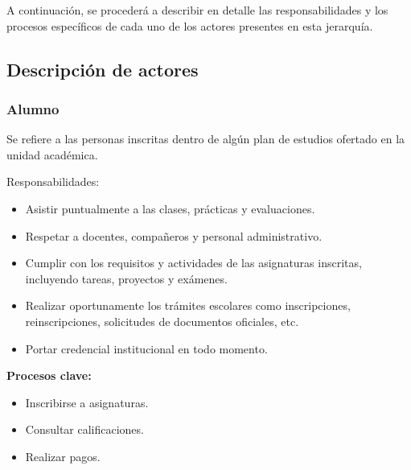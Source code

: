 A continuación, se procederá a describir en detalle las responsabilidades y los procesos específicos de cada uno de los actores presentes en esta jerarquía.






\newpage

\subsection{Descripción de actores}

\begin{Usuario}{\hypertarget{tAlumno}{\subsubsection{Alumno}}}{
    Se refiere a las personas inscritas dentro de algún plan de estudios ofertado en la unidad académica.
}

\item[Responsabilidades:] \cdtEmpty
\begin{itemize}
    \item Asistir puntualmente a las clases, prácticas y evaluaciones.
    \item Respetar a docentes, compañeros y personal administrativo.
    \item Cumplir con los requisitos y actividades de las asignaturas inscritas, incluyendo tareas, proyectos y exámenes.
    \item Realizar oportunamente los trámites escolares como inscripciones, reinscripciones, solicitudes de documentos oficiales, etc.
    \item Portar credencial institucional en todo momento.
\end{itemize}
\textbf{Procesos clave:} \cdtEmpty
\begin{itemize}
    \item Inscribirse a asignaturas.
    \item Consultar calificaciones.
    \item Realizar pagos.
\end{itemize}
\end{Usuario}


